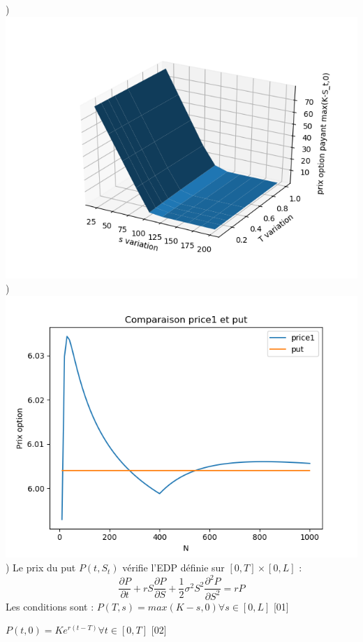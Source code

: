 \documentclass{exam}
\begin{document}
\newline
{}) \includegraphics{question18.png}
\newline
{}) \includegraphics{question19.png}
\newline
{}) Le prix du put $P(t,S_t)$ vérifie l'EDP définie sur $[0,T] \times [0,L]$ : 
$$\frac{\partial P}{\partial t} + rS\frac{\partial P}{\partial S} + \frac{1}{2}\sigma^2 S^2 \frac{\partial^2 P}{\partial S^2}=rP$$
\newline
\espace
Les conditions sont :
\newline
\espace
$P(T,s) = max(K-s,0) \forall s \in [0,L]$  \hspace{0.5cm} [01]

$P(t,0) = K e^{r(t-T)} \forall t \in [0,T]$ \hspace{0.5cm} [02]
\end{document}
